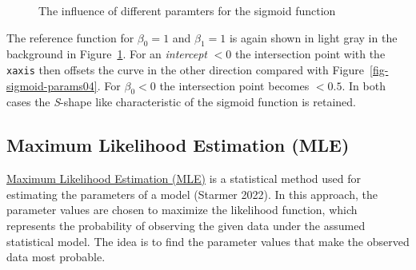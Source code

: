 \documentclass[
  a4paper,
]{scrbook}
\begin{document}
\begin{figure}[H]


\caption{\label{fig-sigmoid-params05}The influence of different
paramters for the sigmoid function}

\end{figure}%

The reference function for \(\beta_0 = 1\) and \(\beta_1 = 1\) is again
shown in light gray in the background in
Figure~\ref{fig-sigmoid-params05}. For an \emph{intercept} \(<0\) the
intersection point with the \texttt{xaxis} then offsets the curve in the
other direction compared with Figure~\ref{fig-sigmoid-params04}. For
\(\beta_0 < 0\) the intersection point becomes \(<0.5\). In both cases
the \emph{S}-shape like characteristic of the sigmoid function is
retained.

\subsection{Maximum Likelihood Estimation
(MLE)}\label{maximum-likelihood-estimation-mle}

\hyperref[MLE]{Maximum Likelihood Estimation (MLE)} is a statistical
method used for estimating the parameters of a model (Starmer 2022). In
this approach, the parameter values are chosen to maximize the
likelihood function, which represents the probability of observing the
given data under the assumed statistical model. The idea is to find the
parameter values that make the observed data most probable.
\end{document}
